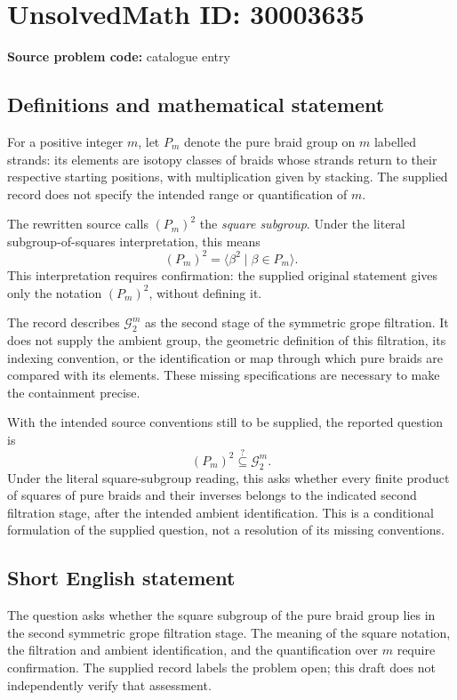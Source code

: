 \documentclass[11pt]{article}
\begin{document}
\section*{UnsolvedMath ID: 30003635}
\textbf{Source problem code:} catalogue entry
\subsection{Definitions and mathematical statement}
For a positive integer \(m\), let \(P_m\) denote the pure braid group on \(m\) labelled strands: its elements are isotopy classes of braids whose strands return to their respective starting positions, with multiplication given by stacking. The supplied record does not specify the intended range or quantification of \(m\).

The rewritten source calls \((P_m)^2\) the \emph{square subgroup}. Under the literal subgroup-of-squares interpretation, this means
\[
(P_m)^2=\langle \beta^2\mid \beta\in P_m\rangle.
\]
This interpretation requires confirmation: the supplied original statement gives only the notation \((P_m)^2\), without defining it.

The record describes \(\mathcal G_2^m\) as the second stage of the symmetric grope filtration. It does not supply the ambient group, the geometric definition of this filtration, its indexing convention, or the identification or map through which pure braids are compared with its elements. These missing specifications are necessary to make the containment precise.

With the intended source conventions still to be supplied, the reported question is
\[
(P_m)^2\stackrel{?}{\subseteq}\mathcal G_2^m.
\]
Under the literal square-subgroup reading, this asks whether every finite product of squares of pure braids and their inverses belongs to the indicated second filtration stage, after the intended ambient identification. This is a conditional formulation of the supplied question, not a resolution of its missing conventions.
\subsection{Short English statement}
The question asks whether the square subgroup of the pure braid group lies in the second symmetric grope filtration stage. The meaning of the square notation, the filtration and ambient identification, and the quantification over \(m\) require confirmation. The supplied record labels the problem open; this draft does not independently verify that assessment.
\end{document}
